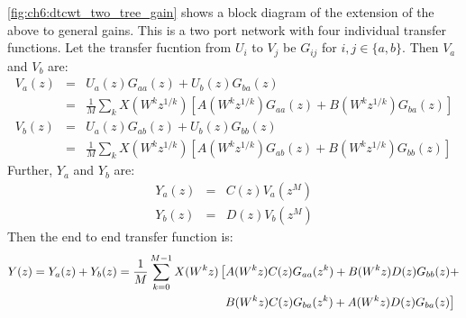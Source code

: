 \autoref{fig:ch6:dtcwt_two_tree_gain} shows a block diagram of the extension of 
the above to general gains. This is a two port network with four individual
transfer functions. Let the transfer fucntion from $U_i$ to $V_j$
be $G_{ij}$ for $i, j \in \{a, b\}$. Then $V_a$ and $V_b$ are:
\begin{eqnarray}
  V_a(z) &=& U_a(z)G_{aa}(z) + U_b(z)G_{ba}(z) \\
         &=& \frac{1}{M} \sum_k X(W^{k} z^{1/k}) \left[A(W^k z^{1/k})G_{aa}(z) +
             B(W^k z^{1/k}) G_{ba}(z) \right] \\
  V_b(z) &=& U_a(z)G_{ab}(z) + U_b(z)G_{bb}(z) \\
         &=& \frac{1}{M} \sum_k X(W^{k} z^{1/k}) \left[A(W^k z^{1/k})G_{ab}(z) +
             B(W^k z^{1/k}) G_{bb}(z) \right] 
\end{eqnarray}
%
Further, $Y_a$ and $Y_b$ are:
\begin{eqnarray}
  Y_a(z) &=& C(z)V_a(z^M) \\
  Y_b(z) &=& D(z)V_b(z^M)
\end{eqnarray}
%
Then the end to end transfer function is:
\begin{equation}
  \begin{split}
    Y(z) = Y_{a}(z) + Y_{b}(z) = \frac{1}{M} \sum_{k=0}^{M-1} X(W^k z)
    & \left[  A(W^kz)C(z)G_{aa}(z^k) + B(W^kz)D(z)G_{bb}(z) + \right. \\
    & \left. \hphantom{[}  B(W^kz)C(z)G_{ba}(z^k) + A(W^kz)D(z)G_{ba}(z) \right] 
    \label{eq:ch6:transfer}
  \end{split}
\end{equation}

